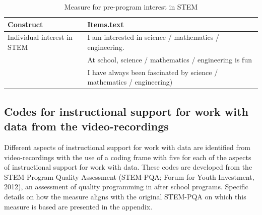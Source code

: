 \documentclass[]{book}
\theoremstyle{definition}
\theoremstyle{definition}
\theoremstyle{definition}
\theoremstyle{remark}
\begin{document}
\begin{table}

\caption{\label{tab:unnamed-chunk-6}Measure for pre-program interest in STEM}
\centering
\begin{tabular}[t]{ll}
\toprule
Construct & Items.text\\
\midrule
Individual interest in STEM & I am interested in science / mathematics / engineering.\\
 & At school, science / mathematics / engineering is fun\\
 & I have always been fascinated by science / mathematics / engineering)\\
\bottomrule
\end{tabular}
\end{table}

\subsection{Codes for instructional support for work with data from the
video-recordings}\label{codes-for-instructional-support-for-work-with-data-from-the-video-recordings}

Different aspects of instructional support for work with data are
identified from video-recordings with the use of a coding frame with
five for each of the aspects of instructional support for work with
data. These codes are developed from the STEM-Program Quality Assessment
(STEM-PQA; Forum for Youth Investment, 2012), an assessment of quality
programming in after school programs. Specific details on how the
measure aligns with the original STEM-PQA on which this measure is based
are presented in the appendix.

\begin{table}

\caption{\label{tab:unnamed-chunk-7}Coding Frame for Instructional Support for Work With Data}
\centering
{}
\end{table}
\end{document}
